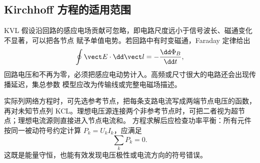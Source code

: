 \subsection*{Kirchhoff 方程的适用范围}

KVL 假设沿回路的感应电场贡献可忽略，即电路尺度远小于信号波长、磁通变化不显著，可以把各节点
赋予单值电势。若回路中有时变磁通，Faraday 定律给出
\begin{equation}
 \oint\vect E\cdot\dd\vect l=-\frac{\dd\Phi_B}{\dd t},
\end{equation}
回路电压和不再为零，必须把感应电动势计入。高频或尺寸很大的电路还会出现传播延迟，集总参数
模型应改为传输线或完整电磁场描述。

实际列网络方程时，可先选参考节点，把每条支路电流写成两端节点电压的函数，再对未知节点列
KCL。理想电压源连接两个非参考节点时，可把二者视为超节点；理想电流源则直接进入节点电流和。
方程求解后应检查功率平衡：所有元件按同一被动符号约定计算 $P_k=U_kI_k$，应满足
\begin{equation}
 \sum_k P_k=0.
\end{equation}
这既是能量守恒，也能有效发现电压极性或电流方向的符号错误。
